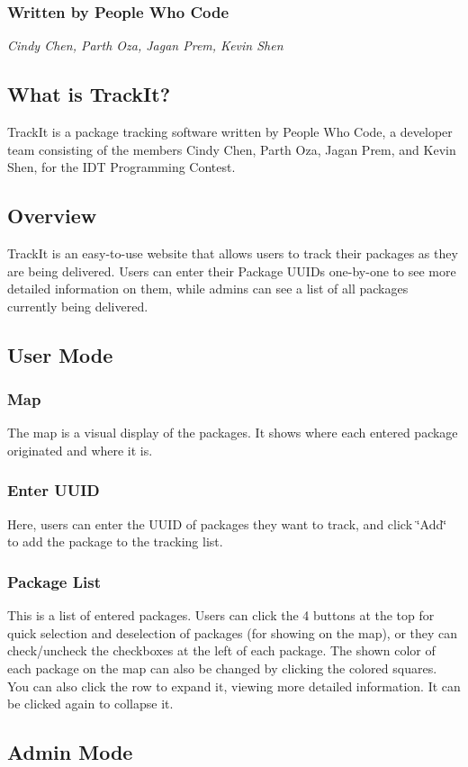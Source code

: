 \subsubsection*{Written by People Who Code}

{\itshape  Cindy Chen, Parth Oza, Jagan Prem, Kevin Shen }

\subsection*{What is Track\+It?}

Track\+It is a package tracking software written by People Who Code, a developer team consisting of the members Cindy Chen, Parth Oza, Jagan Prem, and Kevin Shen, for the I\+DT Programming Contest. ​  \subsection*{Overview}

Track\+It is an easy-\/to-\/use website that allows users to track their packages as they are being delivered. Users can enter their Package U\+U\+I\+Ds one-\/by-\/one to see more detailed information on them, while admins can see a list of all packages currently being delivered. ​ \subsection*{User Mode}

\subsubsection*{Map}

 The map is a visual display of the packages. It shows where each entered package originated and where it is. ​ \subsubsection*{Enter U\+U\+ID}

Here, users can enter the U\+U\+ID of packages they want to track, and click \char`\"{}\+Add\char`\"{} to add the package to the tracking list.  \subsubsection*{Package List}

This is a list of entered packages. Users can click the 4 buttons at the top for quick selection and deselection of packages (for showing on the map), or they can check/uncheck the checkboxes at the left of each package. The shown color of each package on the map can also be changed by clicking the colored squares. You can also click the row to expand it, viewing more detailed information. It can be clicked again to collapse it.  ​ \subsection*{Admin Mode}

